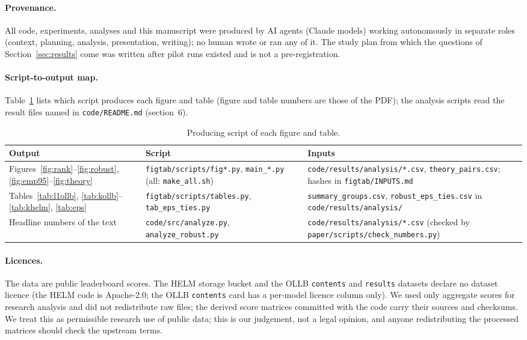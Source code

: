 \paragraph{Provenance.}
All code, experiments, analyses and this manuscript were produced by AI agents (Claude models) working autonomously in separate roles (context, planning, analysis, presentation, writing); no human wrote or ran any of it. The study plan from which the questions of Section~\ref{sec:results} come was written after pilot runs existed and is not a pre-registration.

\paragraph{Script-to-output map.}
Table~\ref{tab:map} lists which script produces each figure and table (figure and table numbers are those of the PDF); the analysis scripts read the result files named in \texttt{code/README.md} (section~6).
\begin{table}[h]
\centering\small
\caption{Producing script of each figure and table.}\label{tab:map}
\begin{tabular}{p{2.0cm}p{5.4cm}p{5.1cm}}
\toprule
Output & Script & Inputs \\
\midrule
Figures~\ref{fig:rank}--\ref{fig:robust}, \ref{fig:emp95}--\ref{fig:theory} & \texttt{figtab/scripts/}\texttt{fig*.py}, \texttt{main\_*.py} (all: \texttt{make\_all.sh}) & \texttt{code/results/analysis/*.csv}, \texttt{theory\_pairs.csv}; hashes in \texttt{figtab/INPUTS.md} \\
Tables~\ref{tab:l1ollb}, \ref{tab:kollb}--\ref{tab:khelm}, \ref{tab:eps} & \texttt{figtab/scripts/}\texttt{tables.py}, \texttt{tab\_eps\_ties.py} & \texttt{summary\_groups.csv}, \texttt{robust\_eps\_ties.csv} in \texttt{code/results/analysis/} \\
Headline numbers of the text & \texttt{code/src/analyze.py}, \texttt{analyze\_robust.py} & \texttt{code/results/analysis/*.csv} (checked by \texttt{paper/scripts/check\_numbers.py}) \\
\bottomrule
\end{tabular}
\end{table}

\paragraph{Licences.}
The data are public leaderboard scores. The HELM storage bucket and the OLLB \texttt{contents} and \texttt{results} datasets declare no dataset licence (the HELM code is Apache-2.0; the OLLB \texttt{contents} card has a per-model licence column only). We used only aggregate scores for research analysis and did not redistribute raw files; the derived score matrices committed with the code carry their sources and checksums. We treat this as permissible research use of public data; this is our judgement, not a legal opinion, and anyone redistributing the processed matrices should check the upstream terms.

